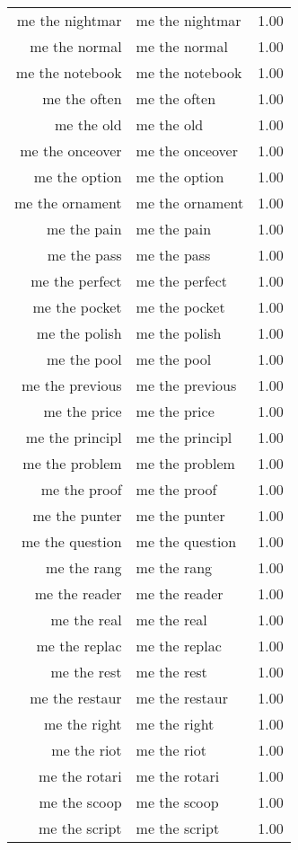 \begin{table}[ht]
\begin{tabular}{rlr}
  me the nightmar & me the nightmar & 1.00 \\ 
  me the normal & me the normal & 1.00 \\ 
  me the notebook & me the notebook & 1.00 \\ 
  me the often & me the often & 1.00 \\ 
  me the old & me the old & 1.00 \\ 
  me the onceover & me the onceover & 1.00 \\ 
  me the option & me the option & 1.00 \\ 
  me the ornament & me the ornament & 1.00 \\ 
  me the pain & me the pain & 1.00 \\ 
  me the pass & me the pass & 1.00 \\ 
  me the perfect & me the perfect & 1.00 \\ 
  me the pocket & me the pocket & 1.00 \\ 
  me the polish & me the polish & 1.00 \\ 
  me the pool & me the pool & 1.00 \\ 
  me the previous & me the previous & 1.00 \\ 
  me the price & me the price & 1.00 \\ 
  me the principl & me the principl & 1.00 \\ 
  me the problem & me the problem & 1.00 \\ 
  me the proof & me the proof & 1.00 \\ 
  me the punter & me the punter & 1.00 \\ 
  me the question & me the question & 1.00 \\ 
  me the rang & me the rang & 1.00 \\ 
  me the reader & me the reader & 1.00 \\ 
  me the real & me the real & 1.00 \\ 
  me the replac & me the replac & 1.00 \\ 
  me the rest & me the rest & 1.00 \\ 
  me the restaur & me the restaur & 1.00 \\ 
  me the right & me the right & 1.00 \\ 
  me the riot & me the riot & 1.00 \\ 
  me the rotari & me the rotari & 1.00 \\ 
  me the scoop & me the scoop & 1.00 \\ 
  me the script & me the script & 1.00 \\ 

\end{tabular}
\end{table}
